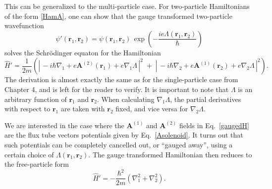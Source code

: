 \documentclass[pra,12pt]{revtex4}
\begin{document}
This can be generalized to the multi-particle case.  For two-particle
Hamiltonians of the form \eqref{HamA}, one can show that the gauge
transformed two-particle wavefunction
\begin{equation}
  \psi'(\mathbf{r}_1, \mathbf{r}_2) = \psi(\mathbf{r}_1, \mathbf{r}_2)
  \, \exp\!\left(-\frac{ie\Lambda(\mathbf{r}_1, \mathbf{r}_2)}{\hbar}\right)
\end{equation}
solves the Schr\"odinger equaton for the Hamiltonian
\begin{equation}
  \hat{H}' = \frac{1}{2m} \left( \left| \, -i\hbar \nabla_1
  + e\mathbf{A}^{(2)}(\mathbf{r}_1) + e \nabla_1 \Lambda\,\right|^2
  \;+\; \left| \, -i\hbar \nabla_2
  + e\mathbf{A}^{(1)}(\mathbf{r}_2) + e \nabla_2\Lambda\,\right|^2\right).
  \label{gaugedH}
\end{equation}
The derivation is almost exactly the same as for the single-particle
case from Chapter 4, and is left for the reader to verify.  It is
important to note that $\Lambda$ is an arbitrary function of
$\mathbf{r}_1$ and $\mathbf{r}_2$.  When calculating
$\nabla_1\Lambda$, the partial derivatives with respect to
$\mathbf{r}_1$ are taken with $\mathbf{r}_2$ fixed, and vice versa for
$\nabla_2\Lambda$.

We are interested in the case where the $\mathbf{A}^{(1)}$ and
$\mathbf{A}^{(2)}$ fields in Eq.~\eqref{gaugedH} are the flux tube
vectors potentials given by Eq.~\eqref{Asolenoid}.  It turns out that
such potentials can be completely cancelled out, or ``gauged away'',
using a certain choice of $\Lambda(\mathbf{r}_1, \mathbf{r}_2)$.  The
gauge transformed Hamiltonian then reduces to the free-particle form
\begin{equation}
  \hat{H}' = - \frac{\hbar^2}{2m} \left( \nabla_1^2 + \nabla_2^2\right).
  \label{gaugedH2}
\end{equation}
\end{document}
